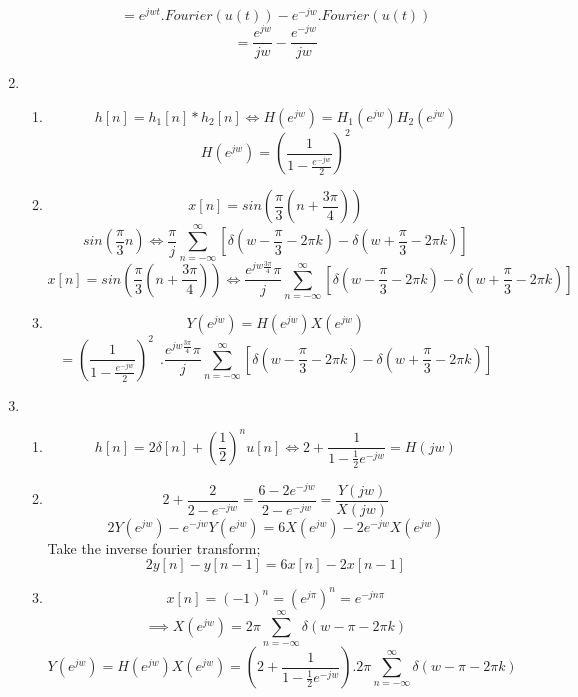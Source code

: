 \documentclass[10pt,a4paper, margin=1in]{article}
\begin{document}
\begin{enumerate}
\begin{enumerate}
        $$ = e^{jwt}.Fourier(u(t)) - e^{-jw}.Fourier(u(t)) $$
        $$ = \frac{e^{jw}}{jw} - \frac{e^{-jw}}{jw} $$
    \end{enumerate}
\newpage
\item %
    \begin{enumerate}
    \item %
        $$ h[n] = h_1[n]*h_2[n] \Longleftrightarrow H(e^{jw}) = H_1(e^{jw})H_2(e^{jw}) $$
        $$ H(e^{jw}) = (\frac{1}{1-\frac{e^{-jw}}{2}})^2 $$
    \item %
        $$ x[n] = sin(\frac{\pi}{3} (n+ \frac{3\pi}{4})) $$
        $$ sin(\frac{\pi}{3}n) \Longleftrightarrow \frac{\pi}{j} \sum_{n= -\infty}^{\infty} [\delta(w- \frac{\pi}{3} - 2\pi k) - \delta(w + \frac{\pi}{3} - 2\pi k)] $$
        $$ x[n] = sin(\frac{\pi}{3}(n + \frac{3\pi}{4})) \Longleftrightarrow \frac{e^{jw\frac{3\pi}{4}}\pi}{j} \sum_{n= -\infty}^{\infty} [\delta(w- \frac{\pi}{3} - 2\pi k) - \delta(w + \frac{\pi}{3} - 2\pi k)]  $$
    \item %
        $$ Y(e^{jw}) = H(e^{jw})X(e^{jw}) $$
        $$ = (\frac{1}{1-\frac{e^{-jw}}{2}})^2 \ \ . \frac{e^{jw\frac{3\pi}{4}}\pi}{j} \sum_{n= -\infty}^{\infty} [\delta(w- \frac{\pi}{3} - 2\pi k) - \delta(w + \frac{\pi}{3} - 2\pi k)] $$
    \end{enumerate}
\hline
\item %
    \begin{enumerate}
    \item %
        $$ h[n] = 2\delta[n] + (\frac{1}{2})^n u[n] \Longleftrightarrow 2 + \frac{1}{1- \frac{1}{2} e^{-jw}} = H(jw) $$
    \item %
        $$ 2 + \frac{2}{2- e^{-jw}} = \frac{6 - 2e^{-jw}}{2- e^{-jw}} = \frac{Y(jw)}{X(jw)} $$
        $$ 2Y(e^{jw}) - e^{-jw}Y(e^{jw}) = 6X(e^{jw}) - 2e^{-jw}X(e^{jw})$$
        Take the inverse fourier transform;
        $$ 2y[n] - y[n-1] = 6x[n] - 2x[n-1] $$
    \item %
        $$ x[n] = (-1)^n = (e^{j\pi})^n = e^{-jn\pi} $$
        $$ \implies X(e^{jw}) = 2\pi \sum_{n= -\infty}^{\infty} \delta(w- \pi - 2\pi k)$$
        $$ Y(e^{jw}) = H(e^{jw})X(e^{jw}) = (2 + \frac{1}{1- \frac{1}{2} e^{-jw}}).2\pi \sum_{n= -\infty}^{\infty} \delta(w- \pi - 2\pi k) $$
    \end{enumerate}

\end{enumerate}
\end{document}
